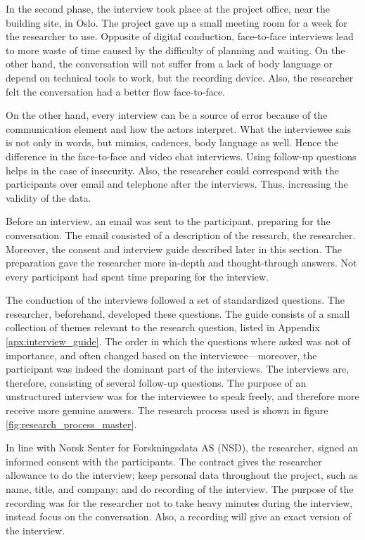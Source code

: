 In the second phase, the interview took place at the project office, near the building site, in Oslo. The project gave up a small meeting room for a week for the researcher to use. Opposite of digital conduction, face-to-face interviews lead to more waste of time caused by the difficulty of planning and waiting. On the other hand, the conversation will not suffer from a lack of body language or depend on technical tools to work, but the recording device. Also, the researcher felt the conversation had a better flow face-to-face. 

On the other hand, every interview can be a source of error because of the communication element and how the actors interpret. What the interviewee sais is not only in words, but mimics, cadences, body language as well. Hence the difference in the face-to-face and video chat interviews. Using follow-up questions helps in the case of insecurity. Also, the researcher could correspond with the participants over email and telephone after the interviews. Thus, increasing the validity of the data. 

Before an interview, an email was sent to the participant, preparing for the conversation. The email consisted of a description of the research, the researcher. Moreover, the consent and interview guide described later in this section. The preparation gave the researcher more in-depth and thought-through answers. Not every participant had spent time preparing for the interview. 

The conduction of the interviews followed a set of standardized questions. The researcher, beforehand, developed these questions. The guide consists of a small collection of themes relevant to the research question, listed in Appendix \ref{apx:interview_guide}. The order in which the questions where asked was not of importance, and often changed based on the interviewee—moreover, the participant was indeed the dominant part of the interviews. The interviews are, therefore, consisting of several follow-up questions. The purpose of an unstructured interview was for the interviewee to speak freely, and therefore more receive more genuine answers. The research process used is shown in figure \ref{fig:research_process_master}.

In line with Norsk Senter for Forskningsdata AS (NSD), the researcher, signed an informed consent with the participants. The contract gives the researcher allowance to do the interview; keep personal data throughout the project, such as name, title, and company; and do recording of the interview. The purpose of the recording was for the researcher not to take heavy minutes during the interview, instead focus on the conversation. Also, a recording will give an exact version of the interview. 


